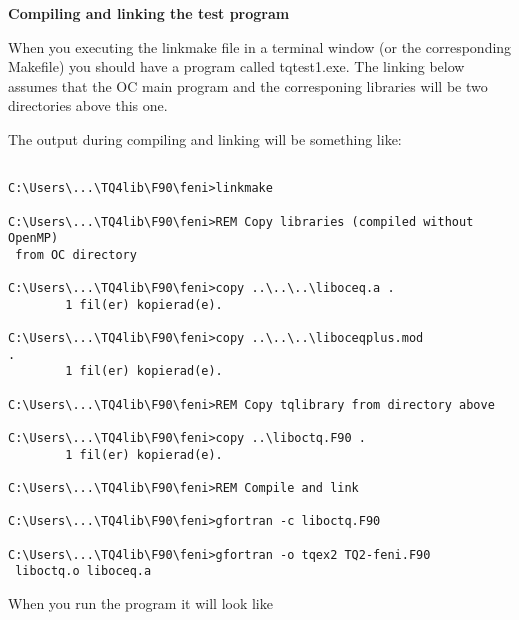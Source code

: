 \documentclass[12pt]{article}
\begin{document}
\newpage

{\bf Compiling and linking the test program}

\bigskip

When you executing the linkmake file in a terminal window (or the
corresponding Makefile) you should have a program called tqtest1.exe.
The linking below assumes that the OC main program and the corresponing
libraries will be two directories above this one.

The output during compiling and linking will be something like:

{\small
\begin{verbatim}

C:\Users\...\TQ4lib\F90\feni>linkmake

C:\Users\...\TQ4lib\F90\feni>REM Copy libraries (compiled without OpenMP)
 from OC directory

C:\Users\...\TQ4lib\F90\feni>copy ..\..\..\liboceq.a .
        1 fil(er) kopierad(e).

C:\Users\...\TQ4lib\F90\feni>copy ..\..\..\liboceqplus.mod
.
        1 fil(er) kopierad(e).

C:\Users\...\TQ4lib\F90\feni>REM Copy tqlibrary from directory above

C:\Users\...\TQ4lib\F90\feni>copy ..\liboctq.F90 .
        1 fil(er) kopierad(e).

C:\Users\...\TQ4lib\F90\feni>REM Compile and link

C:\Users\...\TQ4lib\F90\feni>gfortran -c liboctq.F90

C:\Users\...\TQ4lib\F90\feni>gfortran -o tqex2 TQ2-feni.F90
 liboctq.o liboceq.a

\end{verbatim}}

When you run the program it will look like
\end{document}
